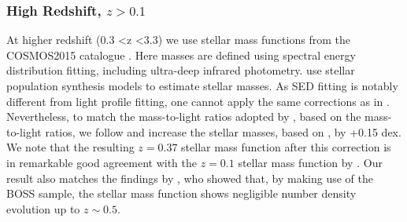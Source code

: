 \subsubsection{High Redshift, $z > 0.1$}
\label{subsub:Davidzon}
At higher redshift (0.3 \textless z \textless 3.3) we use stellar mass functions from the COSMOS2015 catalogue \citep{Davidzon2017TheSnapshots}. Here masses are defined using spectral energy distribution fitting, including ultra-deep infrared photometry. \citet{Davidzon2017TheSnapshots} use \citet{Bruzual2003Stellar2003} stellar population synthesis models to estimate stellar masses. As SED fitting is notably different from light profile fitting, one cannot apply the same corrections as in \citet{Mendel2014ASURVEY}. 
Nevertheless, to match the mass-to-light ratios adopted by \citet{Mendel2014ASURVEY}, based on the \citet{Bell2003TheFunctions} mass-to-light ratios, we follow \citet{Bernardi2013TheProfile} and increase the \citet{Davidzon2017TheSnapshots} stellar masses, based on \citet{Bruzual2003Stellar2003}, by +0.15 dex. We note that the resulting $z=0.37$ stellar mass function after this correction is in remarkable good agreement with the $z=0.1$ stellar mass function by \citep{Bernardi2013TheProfile}. Our result also matches the findings by \citet{Bernardi2016TheEvolution}, who showed that, by making use of the BOSS sample, the stellar mass function shows negligible number density evolution up to $z \sim 0.5$.

\label{subsec:Clusters}
